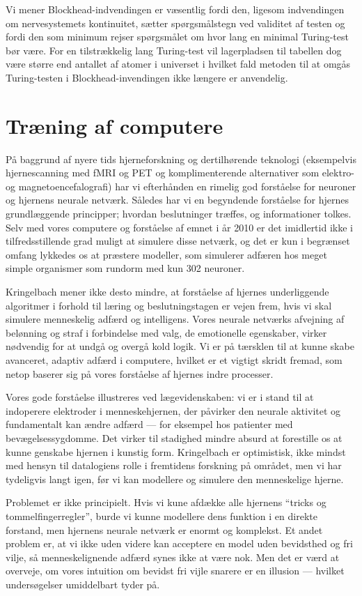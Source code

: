 \documentclass{article}
\begin{document}
Vi mener Blockhead-indvendingen er væsentlig fordi den, ligesom indvendingen om nervesystemets kontinuitet, sætter spørgsmålstegn ved validitet af testen og fordi den som minimum rejser spørgsmålet om hvor lang en minimal Turing-test bør være. For en tilstrækkelig lang Turing-test vil lagerpladsen til tabellen dog være større end antallet af atomer i universet i hvilket fald metoden til at omgås Turing-testen i Blockhead-invendingen ikke længere er anvendelig.

\section{Træning af computere}
På baggrund af nyere tids hjerneforskning og dertilhørende teknologi (eksempelvis hjernescanning med fMRI og PET og komplimenterende alternativer som elektro- og magnetoencefalografi) har vi efterhånden en rimelig god forståelse for neuroner og hjernens neurale netværk. Således har vi en begyndende forståelse for hjernes grundlæggende principper; hvordan beslutninger træffes, og informationer tolkes. Selv med vores computere og forståelse af emnet i år 2010 er det imidlertid ikke i tilfredsstillende grad muligt at simulere disse netværk, og det er kun i begrænset omfang lykkedes os at præstere modeller, som simulerer adfæren hos meget simple organismer som rundorm med kun 302 neuroner.

Kringelbach mener ikke desto mindre, at forståelse af hjernes underliggende algoritmer i forhold til læring og beslutningstagen er vejen frem, hvis vi skal simulere menneskelig adfærd og intelligens. Vores neurale netværks afvejning af belønning og straf i forbindelse med valg, de emotionelle egenskaber, virker nødvendig for at undgå og overgå kold logik. Vi er på tærsklen til at kunne skabe avanceret, adaptiv adfærd i computere, hvilket er et vigtigt skridt fremad, som netop baserer sig på vores forståelse af hjernes indre processer.

Vores gode forståelse illustreres ved lægevidenskaben: vi er i stand til at indoperere elektroder i menneskehjernen, der påvirker den neurale aktivitet og fundamentalt kan ændre adfærd --- for eksempel hos patienter med bevægelsessygdomme. Det virker til stadighed mindre absurd at forestille os at kunne genskabe hjernen i kunstig form. Kringelbach er optimistisk, ikke mindst med hensyn til datalogiens rolle i fremtidens forskning på området, men vi har tydeligvis langt igen, før vi kan modellere og simulere den menneskelige hjerne. 

Problemet er ikke principielt. Hvis vi kune afdække alle hjernens ``tricks og tommelfingerregler'', burde vi kunne modellere dens funktion i en direkte forstand, men hjernens neurale netværk er enormt og komplekst. Et andet problem er, at vi ikke uden videre kan acceptere en model uden bevidsthed og fri vilje, så menneskelignende adfærd synes ikke at være nok. Men det er værd at overveje, om vores intuition om bevidst fri vijle snarere er en illusion --- hvilket undersøgelser umiddelbart tyder på.
\end{document}
